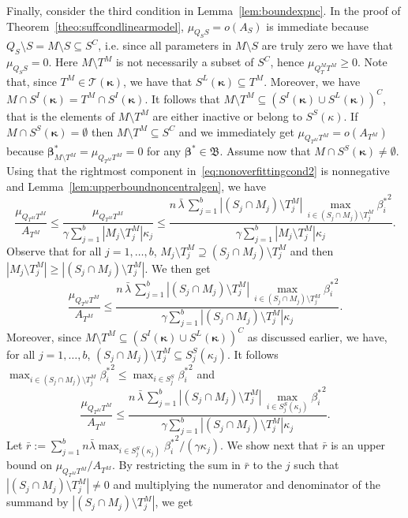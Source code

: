 \documentclass[
  12pt]{article}
\newcommand{\T}{\mathcal{T}}
\newcommand{\bbeta}{\boldsymbol{\beta}}
\newcommand{\bB}{\mathfrak{B}}
\newcommand{\bkappa}{\boldsymbol{\kappa}}
\begin{document}
Finally, consider the third condition in Lemma~\ref{lem:boundexpnc}.
In the proof of Theorem~\ref{theo:suffcondlinearmodel}, $\mu_{Q_SS}=o(A_S)$ is immediate because $ Q_S \setminus S= M\setminus S\subseteq S^C$, i.e. since all parameters in $M \setminus S$ are truly zero we have that $\mu_{Q_SS}=0$.
Here $M\setminus T^M$ is not necessarily a subset of $S^C$, hence $\mu_{Q_T^M T^M} \geq 0$. Note that, since $T^M\in\T(\bkappa)$, we have that $S^L(\bkappa)\subseteq T^M$. Moreover, we have $M\cap S^{I}(\bkappa)=T^M\cap S^{I}(\bkappa)$. It follows that $M\setminus T^M\subseteq (S^{I}(\bkappa) \cup S^L(\bkappa))^C$, that is the elements of $M\setminus T^M$ are either inactive or belong to $S^S(\kappa)$. If $M\cap S^{S}(\bkappa)=\emptyset$ then $M\setminus T^M\subseteq S^C$ and we immediately get $\mu_{Q_{T^M} T^M}=o(A_{T^M})$ because $\bbeta^*_{M \setminus T^M}=\mu_{Q_{T^M} T^M}=0$ for any $\bbeta^*\in \bB$. Assume now that $M\cap S^{S}(\bkappa)\neq\emptyset$. Using that the rightmost component in~\eqref{eq:nonoverfittingcond2} is nonnegative and Lemma~\ref{lem:upperboundnoncentralgen}, we have
$$\frac{\mu_{Q_{T^M} T^M}}{ A_{T^M}} \leq \frac{\mu_{Q_{T^M} T^M}}{ \gamma\sum_{j=1}^b|M_j \setminus T^M_j|\kappa_j} \leq \frac{n\,\bar{\lambda}\,\sum_{j=1}^b|(S_j\cap M_j )\setminus T^M_j|\,\max_{i\in (S_j\cap M_j )\setminus T^M_j}{\beta_{i}^*}^2}{ \gamma\sum_{j=1}^b|M_j \setminus T^M_j|\kappa_j}.$$
Observe that for all $j=1,\ldots,b$, $M_j \setminus T^M_j \supseteq (S_j\cap M_j )\setminus T^M_j$ and then $|M_j \setminus T^M_j| \geq |(S_j\cap M_j )\setminus T^M_j|$. We then get
$$\frac{\mu_{Q_{T^M} T^M}}{ A_{T^M}} \leq \frac{n\,\bar{\lambda}\,\sum_{j=1}^b|(S_j\cap M_j )\setminus T^M_j|\,\max_{i\in(S_j\cap M_j )\setminus T^M_j}{\beta_{i}^*}^2}{ \gamma\sum_{j=1}^b|(S_j\cap M_j ) \setminus T^M_j|\kappa_j}.$$
Moreover, since  $M\setminus T^M\subseteq (S^{I}(\bkappa) \cup S^L(\bkappa))^C$ as discussed earlier, we have, for all $j=1,\ldots,b$, $(S_j\cap M_j )\setminus T^M_j \subseteq S_j^{S}(\kappa_j)$. It follows $\max_{i\in(S_j\cap M_j )\setminus T^M_j}{\beta_{i}^*}^2 \leq \max_{i\in S_j^S}{\beta_{i}^*}^2$ and
\begin{equation}\label{eq:onbfsa}
  \frac{\mu_{Q_{T^M} T^M}}{ A_{T^M}} \leq \frac{n\,\bar{\lambda}\,\sum_{j=1}^b|(S_j\cap M_j )\setminus T^M_j|\,\max_{i\in S_j^{S}(\kappa_j)}{\beta_{i}^*}^2}{ \gamma\sum_{j=1}^b|(S_j\cap M_j ) \setminus T^M_j|\kappa_j}.  
\end{equation}
Let $\bar{r}:=\sum_{j=1}^b n\bar{\lambda}\max_{i\in S_j^{S}(\kappa_j)}{\beta_i^*}^2/(\gamma\kappa_j)$. We show next that $\bar{r}$ is an upper bound on $\mu_{Q_{T^M} T^M}/ A_{T^M}$. By restricting the sum in $\bar{r}$ to the $j$ such that $|(S_j\cap M_j )\setminus T^M_j|\neq 0$ and multiplying the numerator and denominator of the summand by $|(S_j\cap M_j )\setminus T^M_j|$, we get 
\end{document}
